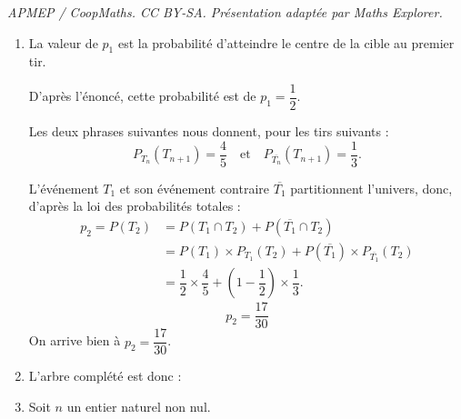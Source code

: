 \documentclass[10pt]{article}
\begin{document}
\noindent\textit{APMEP / CoopMaths. CC BY-SA. Présentation adaptée par Maths Explorer.}\par\medskip
\begin{enumerate}
\item La valeur de $p_1$ est la probabilité d'atteindre le centre de la cible au premier tir.

D'après l'énoncé, cette probabilité est de $p_1=\dfrac12$.

Les deux phrases suivantes nous donnent, pour les tirs suivants :
\[
P_{T_n}(T_{n+1})=\dfrac45 \quad \text{et} \quad P_{\overline{T_n}}(T_{n+1})=\dfrac13.
\]

L'événement $T_1$ et son événement contraire $\overline{T_1}$ partitionnent l'univers, donc, d'après la loi des probabilités totales :
\[
\begin{aligned}
p_2=P(T_2)&=P(T_1\cap T_2)+P(\overline{T_1}\cap T_2)\\
&=P(T_1)\times P_{T_1}(T_2)+P(\overline{T_1})\times P_{\overline{T_1}}(T_2)\\
&=\dfrac12\times \dfrac45+\left(1-\dfrac12\right)\times \dfrac13.
\end{aligned}
\]
\[
p_2=\dfrac{17}{30}
\]
On arrive bien à $p_2=\dfrac{17}{30}$.

\item L'arbre complété est donc :

\begin{center}
\end{center}

\item Soit $n$ un entier naturel non nul.


\end{enumerate}
\end{document}
